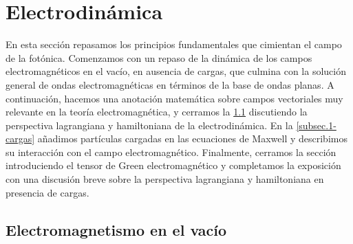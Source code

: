 \section{Electrodinámica}
\label{sec.1-electrodinamica}

En esta sección repasamos los principios fundamentales que cimientan el campo de la fotónica. Comenzamos con un repaso de la dinámica de los campos electromagnéticos en el vacío, en ausencia de cargas, que culmina con la solución general de ondas electromagnéticas en términos de la base de ondas planas. A continuación, hacemos una anotación matemática sobre campos vectoriales muy relevante en la teoría electromagnética, y cerramos la \cref{subsec.1-vacío} discutiendo la perspectiva lagrangiana y hamiltoniana de la electrodinámica. En la \cref{subsec.1-cargas} añadimos partículas cargadas en las ecuaciones de Maxwell y describimos su interacción con el campo electromagnético. Finalmente, cerramos la sección introduciendo el tensor de Green electromagnético y completamos la exposición con una discusión breve sobre la perspectiva lagrangiana y hamiltoniana en presencia de cargas.

\subsection{Electromagnetismo en el vacío}
\label{subsec.1-vacío}

